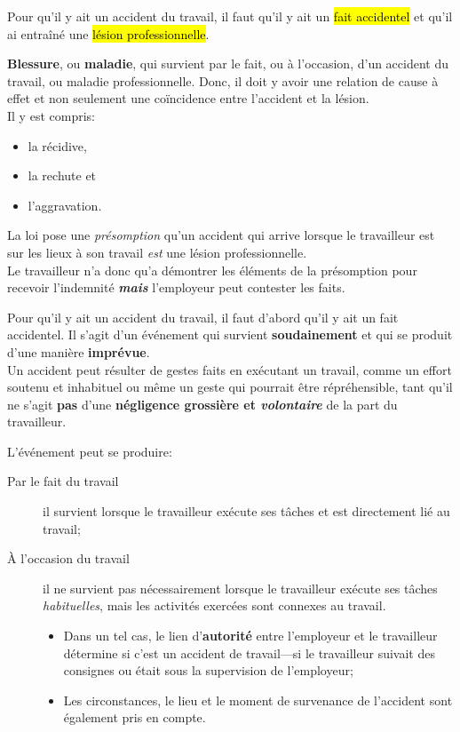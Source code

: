 \documentclass[10pt, french]{article}
\begin{document}
\begin{multicols*}{3}
Pour qu'il y ait un accident du travail, il faut qu'il y ait un \hl{fait accidentel} et qu'il ai entraîné une \hl{lésion professionnelle}.

\begin{definitionNOHFILL}
\textbf{Blessure}, ou \textbf{maladie}, qui survient par le fait, ou à l’occasion, d’un accident du travail, ou maladie professionnelle. Donc, il doit y avoir une relation de cause à effet et non seulement une coïncidence entre l'accident et la lésion.\\

Il y  est compris: 
\begin{itemize}[leftmargin = *]
	\item	la récidive, 
	\item	la rechute et 
	\item	l’aggravation.
\end{itemize}

La loi pose une \textit{présomption} qu'un accident qui arrive lorsque le travailleur est sur les lieux à son travail \textit{est} une lésion professionnelle.\\
Le travailleur n'a donc qu'a démontrer les éléments de la présomption pour recevoir l'indemnité \textit{\textbf{mais}} l'employeur peut contester les faits.
\end{definitionNOHFILL}

\begin{definitionNOHFILL}
Pour qu'il y ait un accident du travail, il faut d'abord qu'il y ait un fait accidentel. Il s'agit d'un événement qui survient \textbf{soudainement} et qui se produit d'une manière \textbf{imprévue}. \\

Un accident peut résulter de gestes faits en exécutant un travail, comme un effort soutenu et inhabituel ou même un geste qui pourrait être répréhensible, tant qu'il ne s'agit \textbf{pas} d'une \textbf{négligence grossière et \textit{volontaire}} de la part du travailleur.
\end{definitionNOHFILL}

L'événement peut se produire:
\begin{description}
	\item[Par le fait du travail]	il survient lorsque le travailleur exécute ses tâches et est directement lié au travail;
	\item[À l'occasion du travail]	il ne survient pas nécessairement lorsque le travailleur exécute ses tâches \textit{habituelles}, mais les activités exercées sont connexes au travail.
		\begin{itemize}[leftmargin = *]
		\item	Dans un tel cas, le lien d'\textbf{autorité} entre l'employeur et le travailleur détermine si c'est un accident de travail---si le travailleur suivait des consignes ou était sous la supervision de l'employeur;
		\item	Les circonstances, le lieu et le moment de survenance de l'accident sont également pris en compte.
		\end{itemize}
\end{description}


\end{multicols*}
\end{document}
